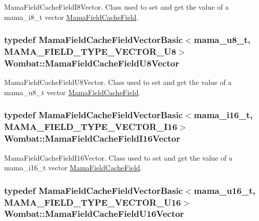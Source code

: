 MamaFieldCacheFieldI8Vector. Class used to set and get the value of a mama\_\-i8\_\-t vector {\ttfamily \hyperlink{classWombat_1_1MamaFieldCacheField}{MamaFieldCacheField}}. \hypertarget{namespaceWombat_af16fbc3a5d95968ee15ad355b9962fdb}{
\subsubsection[{MamaFieldCacheFieldU8Vector}]{\setlength{\rightskip}{0pt plus 5cm}typedef {\bf MamaFieldCacheFieldVectorBasic}$<$mama\_\-u8\_\-t, MAMA\_\-FIELD\_\-TYPE\_\-VECTOR\_\-U8$>$ {\bf Wombat::MamaFieldCacheFieldU8Vector}}}
\label{namespaceWombat_af16fbc3a5d95968ee15ad355b9962fdb}


MamaFieldCacheFieldU8Vector. Class used to set and get the value of a mama\_\-u8\_\-t vector {\ttfamily \hyperlink{classWombat_1_1MamaFieldCacheField}{MamaFieldCacheField}}. \hypertarget{namespaceWombat_af19965fac1b762df2701025c2e5a671c}{
\subsubsection[{MamaFieldCacheFieldI16Vector}]{\setlength{\rightskip}{0pt plus 5cm}typedef {\bf MamaFieldCacheFieldVectorBasic}$<$mama\_\-i16\_\-t, MAMA\_\-FIELD\_\-TYPE\_\-VECTOR\_\-I16$>$ {\bf Wombat::MamaFieldCacheFieldI16Vector}}}
\label{namespaceWombat_af19965fac1b762df2701025c2e5a671c}


MamaFieldCacheFieldI16Vector. Class used to set and get the value of a mama\_\-i16\_\-t vector {\ttfamily \hyperlink{classWombat_1_1MamaFieldCacheField}{MamaFieldCacheField}}. \hypertarget{namespaceWombat_aae47a581fefae219a6e29c98497ba93f}{
\subsubsection[{MamaFieldCacheFieldU16Vector}]{\setlength{\rightskip}{0pt plus 5cm}typedef {\bf MamaFieldCacheFieldVectorBasic}$<$mama\_\-u16\_\-t, MAMA\_\-FIELD\_\-TYPE\_\-VECTOR\_\-U16$>$ {\bf Wombat::MamaFieldCacheFieldU16Vector}}}
\label{namespaceWombat_aae47a581fefae219a6e29c98497ba93f}


